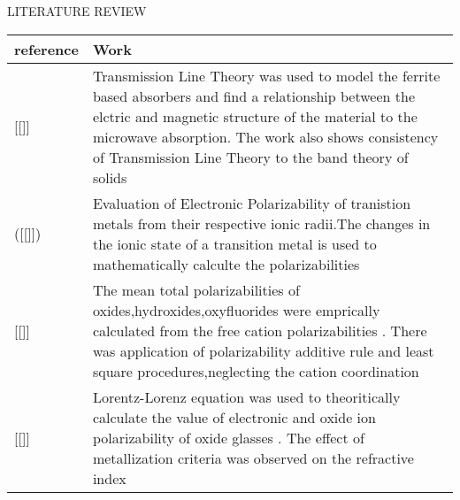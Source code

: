 \documentclass[11pt,aspect ratio=169]{beamer}
\let\oldbib\bibentry
\renewcommand{\bibentry}[1]{{\tiny[\oldbib{#1}]}}
\begin{document}
\begin{frame}{LITERATURE REVIEW}
	
	\begin{tabular}{p{}p{}}
	
		\toprule
		reference & Work \\
		\midrule
		\bibentry{r12} &\small Transmission Line Theory was used to model the ferrite based absorbers and find a relationship between the elctric and magnetic structure of the material to the microwave absorption. The work also shows consistency of Transmission Line Theory to the band theory of solids\\
		(\bibentry{pang2007densitie}) & \small Evaluation of  Electronic Polarizability of tranistion metals from their respective ionic radii.The changes in the ionic state of a transition metal is used to mathematically calculte the polarizabilities\\
		\bibentry{r8} & \small The mean total polarizabilities of oxides,hydroxides,oxyfluorides were emprically calculated from the free cation polarizabilities . There was application of polarizability additive rule and least square procedures,neglecting the cation coordination\\
	\bibentry{r9} & \small Lorentz-Lorenz equation was used to theoritically calculate the value of electronic and oxide ion polarizability of oxide glasses . The effect of metallization criteria was observed on the refractive index\\
		\bottomrule
	
	\end{tabular}
	\end{frame}
\end{document}
